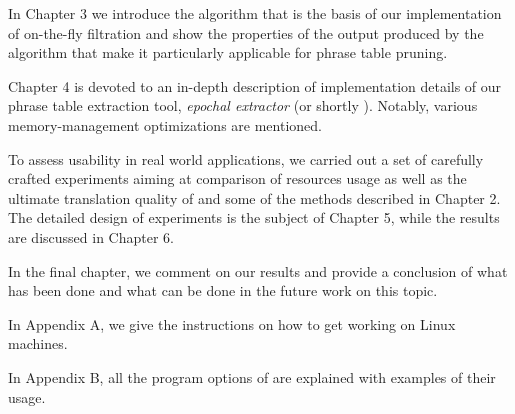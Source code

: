 In Chapter 3 we introduce the algorithm that is the basis of our implementation
of on-the-fly filtration and show the properties of the output produced
by the algorithm that make it particularly applicable for phrase table pruning.

Chapter 4 is devoted to an in-depth description of implementation details of our
phrase table extraction tool, \emph{epochal extractor} (or shortly \eppex{}).
Notably, various memory-management optimizations are mentioned.

To assess \eppex{} usability in real world applications, we carried out a set
of carefully crafted experiments aiming at comparison of resources usage as well as
the ultimate translation quality of \eppex{} and some of the methods described
in Chapter 2.
The detailed design of experiments is the subject of Chapter 5,
while the results are discussed in Chapter 6.

In the final chapter, we comment on our results and provide a conclusion of
what has been done and what can be done in the future work on this topic.

In Appendix A, we give the instructions on how to get \eppex{} working on Linux machines.

In Appendix B, all the program options of \eppex{} are explained with examples of their usage.
